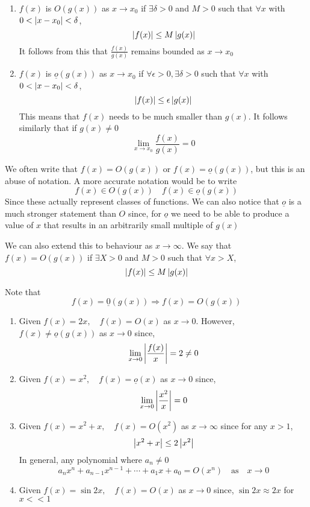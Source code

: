 \documentclass{article}
\begin{document}
\begin{defi}\leavevmode
    \begin{enumerate}
        \item $f(x)$ is $O(g(x))$ as $x \rightarrow x_0$ if $\exists \delta > 0$ and $M > 0$ such that $\forall x$ with $0 < \left\lvert x - x_0\right\rvert < \delta$,
        \[
            \left\lvert f(x)\right\rvert \leq M\left\lvert g(x)\right\rvert  
        \]
        It follows from this that $\frac{f(x)}{g(x)}$ remains bounded as $x \rightarrow x_0$
        \item $f(x)$ is $\underline{o}(g(x))$ as $x \rightarrow x_0$ if $\forall \epsilon > 0, \exists \delta > 0$ such that $\forall x$ with $0 < \left\lvert x - x_0\right\rvert < \delta$,
        \[
            \left\lvert f(x)\right\rvert \leq \epsilon\left\lvert g(x)\right\rvert  
        \]
        This means that $f(x)$ needs to be much smaller than $g(x)$. It follows similarly that if $g(x) \neq 0 $
        \[
            \lim_{x \rightarrow x_0}{\frac{f(x)}{g(x)}} = 0  
        \]
    \end{enumerate}
    We often write that $f(x) = O(g(x))$ or $f(x) = \underline{o}(g(x))$, but this is an abuse of notation. A more accurate notation would be to write
    \[
        f(x) \in O(g(x)) \quad f(x) \in \underline{o}(g(x))
    \]
    Since these actually represent classes of functions. We can also notice that $\underline{o}$ is a much stronger statement than $O$ since, for $\underline{o}$ we need to be able to produce a value of $x$ that results in an arbitrarily small multiple of $g(x)$

    We can also extend this to behaviour as $x \rightarrow \infty$. We say that $f(x) = O(g(x))$ if $\exists X > 0$ and $M > 0$ such that $\forall x > X$,
    \[
        \left\lvert f(x)\right\rvert \leq M\left\lvert g(x)\right\rvert  
    \]

    Note that
    \[
        f(x) = \underline{0}(g(x)) \Rightarrow f(x) = O(g(x))  
    \]
\end{defi}

\begin{eg}\leavevmode
    \begin{enumerate}
        \item Given $f(x) = 2x, \quad f(x) = O(x)$ as $x \rightarrow 0$. However, $f(x) \neq \underline{o}(g(x))$ as $x \rightarrow 0$ since,
        \[
            \lim_{x \rightarrow 0}{\left\lvert \frac{f(x)}{x}\right\rvert} = 2 \neq 0  
        \]
        \item Given $f(x) = x^2, \quad f(x) = \underline{o}(x)$ as $x \rightarrow 0$ since, 
        \[
            \lim_{x \rightarrow 0}{\left\lvert \frac{x^2}{x}\right\rvert} = 0
        \]
        \item Given $f(x) = x^2 + x, \quad f(x) = O(x^2)$ as $x \rightarrow \infty$ since for any $x > 1$,
        \[
            \left\lvert x^2 + x\right\rvert \leq 2\left\lvert x^2\right\rvert  
        \]
        In general, any polynomial where $a_n \neq 0$
        \[
            a_nx^n + a_{n-1}x^{n-1} + \cdots + a_1x + a_0 = O(x^n) \quad \text{as} \quad x \rightarrow 0
        \]
        \item Given $f(x) = \sin{2x}, \quad f(x) = O(x)$ as $x \rightarrow 0$ since, $\sin{2x} \approx 2x$ for $x << 1$
    \end{enumerate}
\end{eg}
\end{document}
